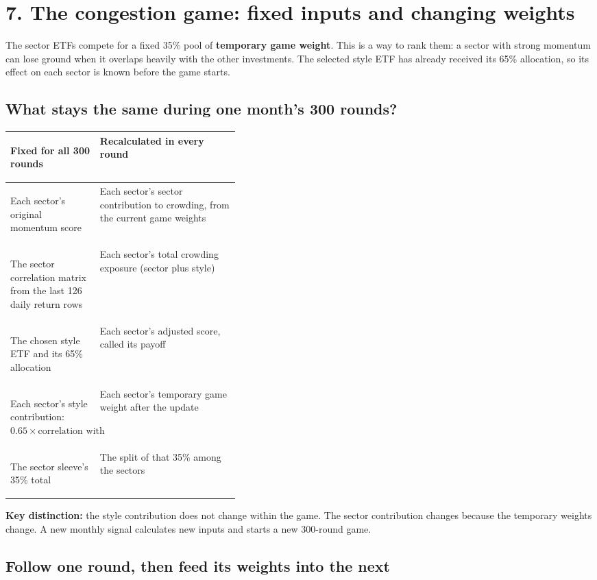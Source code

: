 \documentclass[11pt,letterpaper]{article}
\newcommand{\topic}[1]{\Needspace{5\baselineskip}\subsection*{#1}}
\newcommand{\word}[1]{\text{#1}}
\newcommand{\guidepage}[1]{\clearpage\section*{#1}}
\begin{document}
\guidepage{7. The congestion game: fixed inputs and changing weights}
The sector ETFs compete for a fixed 35\% pool of \textbf{temporary game weight}. This is a way to rank them: a sector with strong momentum can lose ground when it overlaps heavily with the other investments. The selected style ETF has already received its 65\% allocation, so its effect on each sector is known before the game starts.

\topic{What stays the same during one month's 300 rounds?}
\begin{center}
\begin{tabularx}{\linewidth}{@{}>{\bfseries\raggedright\arraybackslash}p{0.39\linewidth}X@{}}
\toprule
Fixed for all 300 rounds & Recalculated in every round\\
\midrule
Each sector's original momentum score & Each sector's sector contribution to crowding, from the current game weights\\
The sector correlation matrix from the last 126 daily return rows & Each sector's total crowding exposure (sector plus style)\\
The chosen style ETF and its 65\% allocation & Each sector's adjusted score, called its payoff\\
Each sector's style contribution: $0.65\times\word{correlation with style ETF}$ & Each sector's temporary game weight after the update\\
The sector sleeve's 35\% total & The split of that 35\% among the sectors\\
\bottomrule
\end{tabularx}
\end{center}
\textbf{Key distinction:} the style contribution does not change within the game. The sector contribution changes because the temporary weights change. A new monthly signal calculates new inputs and starts a new 300-round game.

\topic{Follow one round, then feed its weights into the next}
\begin{center}
\end{center}
\end{document}
